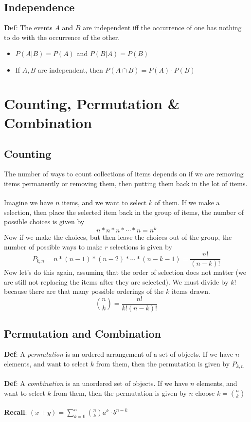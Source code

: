 \documentclass{article}
\begin{document}
\subsection{Independence}
\textbf{Def}: The events $A$ and $B$ are independent iff the occurrence of one has nothing to do with the occurrence of the other.
\begin{itemize}
\item $P(A|B)=P(A)$ and $P(B|A)=P(B)$
\item If $A,B$ are independent, then $P(A\cap B)=P(A)\cdot P(B)$
\end{itemize}

\pagebreak

\section{Counting, Permutation \& Combination}

\subsection{Counting}
The number of ways to count collections of items depends on if we are removing items permanently or removing them, then putting them back in the lot of items.
\\\\
Imagine we have $n$ items, and we want to select $k$ of them. If we make a selection, then place the selected item back in the group of items, the number of possible choices is given by
$$n*n*n*\cdots *n=n^k$$
Now if we make the choices, but then leave the choices out of the group, the number of possible ways to make $r$ selections is given by
$$P_{k,n}=n*(n-1)*(n-2)*\cdots *(n-k-1)=\displaystyle\frac{n!}{(n-k)!}$$
Now let's do this again, assuming that the order of selection does not matter (we are still not replacing the items after they are selected). We must divide by $k!$ because there are that many possible orderings of the $k$ items drawn.
$${n \choose k}=\displaystyle\frac{n!}{k!(n-k)!}$$

\subsection{Permutation and Combination}
\textbf{Def}: A \emph{permutation} is an ordered arrangement of a set of objects. If we have $n$ elements, and want to select $k$ from them, then the permutation is given by $P_{k,n}$
\\\\
\textbf{Def}: A \emph{combination} is an unordered set of objects. If we have $n$ elements, and want to select $k$ from them, then the permutation is given by $n$ choose $k={n \choose k}$
\\\\
\textbf{Recall}: $(x+y)=\displaystyle\sum_{k=0}^n{n\choose k}a^k\cdot b^{n-k}$
\end{document}
